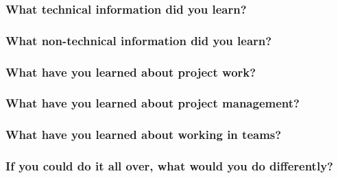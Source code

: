 \subsubsection{What technical information did you learn?}
\subsubsection{What non-technical information did you learn?}
\subsubsection{What have you learned about project work?}
\subsubsection{What have you learned about project management?}
\subsubsection{What have you learned about working in teams?}
\subsubsection{If you could do it all over, what would you do differently?}